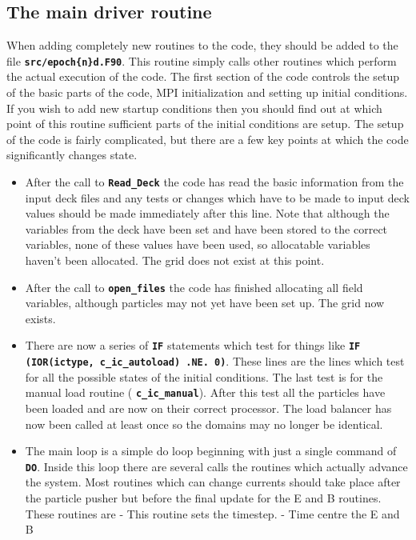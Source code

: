 \documentclass[12pt,a4paper]{article}
\newcommand{\inlinecode}[1]{{\color{warwickred} \bf\texttt{#1}}}
\begin{document}
\subsection{The main driver routine}
When adding completely new routines to the code, they should be added to the
file \inlinecode{src/epoch\{n\}d.F90}. This routine simply calls other routines
which perform the actual execution of the code. The first section of the code
controls the setup of the basic parts of the code, MPI initialization and
setting up initial conditions. If you wish to add new startup conditions then
you should find out at which point of this routine sufficient parts of the
initial conditions are setup. The setup of the code is fairly complicated, but
there are a few key points at which the code significantly changes state.
\begin{itemize}
\item After the call to \inlinecode{Read\_Deck} the code has read the basic
  information from the input deck files and any tests or changes which have to
  be made to input deck values should be made immediately after this line. Note
  that although the variables from the deck have been set and have been stored
  to the correct variables, none of these values have been used, so allocatable
  variables haven't been allocated. The grid does not exist at this point.
\item After the call to \inlinecode{open\_files} the code has finished
  allocating all field variables, although particles may not yet have been set
  up. The grid now exists.
\item There are now a series of \inlinecode{IF} statements which test for
  things like \inlinecode{IF (IOR(ictype, c\_ic\_autoload) .NE. 0)}. These lines
  are the lines which test for all the possible states of the initial
  conditions. The last test is for the manual load routine
  (\inlinecode{c\_ic\_manual}). After this test all the particles have been
  loaded and are now on their correct processor. The load balancer has now been
  called at least once so the domains may no longer be identical.
\item The main loop is a simple do loop beginning with just a single command of
  \inlinecode{DO}. Inside this loop there are several calls the routines which
  actually advance the system. Most routines which can change currents should
  take place after the particle pusher but before the final update for the E
  and B routines. These routines are
  \subitem \inlinecode{set\_dt} - This routine sets the timestep.
  \subitem \inlinecode{update\_eb\_fields\_half} - Time centre the E and B

\end{itemize}
\end{document}
